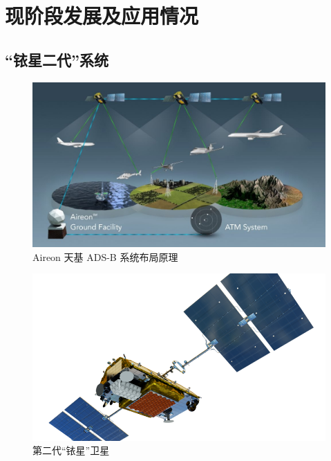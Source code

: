 
\chapter{现阶段发展及应用情况}

\section{“铱星二代”系统}

\begin{figure}[htbp]
\centering
\includegraphics[width=15cm]{pic/Aireon_GlobalSpaceBasedADSB_Coverage_Diagram-1024x576.jpg}
\caption{Aireon 天基 ADS-B 系统布局原理}
\label{fig:Aireon_GlobalSpaceBasedADSB_Coverage_Diagram}
\end{figure}

\begin{figure}[htbp]
\centering
\includegraphics[width=13cm]{pic/IMG_Iridium-Satellite_NEXT-Satellite-Vehicle_HR_FEB16-clip-833x474.png}
\caption{第二代“铱星”卫星}
\label{fig:IMG_Iridium-Satellite_NEXT-Satellite-Vehicle}
\end{figure}

